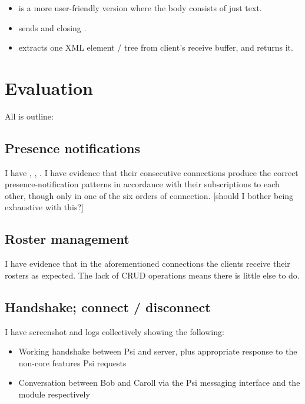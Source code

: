 \documentclass[12pt,a4paper,twoside,openright]{report}
\begin{document}
{\begin{itemize}
  \item {} is a more user-friendly version where the body consists of just text.

  \item {} sends  and closing .

  \item {} extracts one XML element / tree from client's receive buffer, and returns it.

\end{itemize}


\chapter{Evaluation}
All is outline:

\section{Presence notifications}
I have , , . I have evidence that their consecutive connections produce the correct presence-notification patterns in accordance with their subscriptions to each other, though only in one of the six orders of connection. [should I bother being exhaustive with this?]

\section{Roster management}
I have evidence that in the aforementioned connections the clients receive their rosters as expected. The lack of CRUD operations means there is little else to do.

\section{Handshake; connect / disconnect}
I have screenshot and logs collectively showing the following:
\begin{itemize}
  \item Working handshake between Psi and server, plus appropriate  response to the non-core features Psi requests
  \item Conversation between Bob and Caroll via the Psi messaging interface and the  module respectively
\end{itemize}

}
\end{document}
